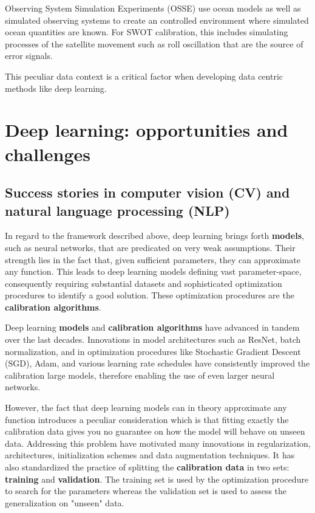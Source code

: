 \begin{bibunit}
Observing System Simulation Experiments (OSSE)\cite{verrierAssessingImpactMultiple2017} use ocean models as well as simulated observing systems to create an controlled environment where simulated ocean quantities are known. For SWOT calibration, this includes simulating processes of the satellite movement such as roll oscillation that are the source of error signals\cite{EmpiricalCrossCalibrationCoherent}.

This peculiar data context is a critical factor when developing data centric methods like deep learning.

% 

\section{Deep learning: opportunities and challenges}

\subsection*{Success stories in computer vision (CV) and natural language processing (NLP)}

In regard to the framework described above, deep learning brings forth \textbf{models}, such as neural networks, that are predicated on very weak assumptions. Their strength lies in the fact that, given sufficient parameters, they can approximate any function\cite{hornikMultilayerFeedforwardNetworks1989}. This leads to deep learning models defining vast parameter-space, consequently requiring substantial datasets and sophisticated optimization procedures to identify a good solution. These optimization procedures are the \textbf{calibration algorithms}.

Deep learning \textbf{models} and \textbf{calibration algorithms} have advanced in tandem over the last decades.
Innovations in model architectures such as ResNet\cite{heDeepResidualLearning2016}, batch normalization\cite{ioffeBatchNormalizationAccelerating2015}, and in optimization procedures like Stochastic Gradient Descent (SGD)\cite{summaLargeScaleMachineLearning2011}, Adam\cite{kingmaAdamMethodStochastic2017}, and various learning rate schedules have consistently improved the calibration large models, therefore enabling the use of even larger neural networks. 

However, the fact that deep learning models can in theory approximate any function introduces a peculiar consideration which is that fitting exactly the calibration data gives you no guarantee on how the model will behave on unseen data.
Addressing this problem have motivated many innovations in regularization, architectures, initialization schemes and data augmentation techniques.
It has also standardized the practice of splitting the \textbf{calibration data} in two sets: \textbf{training} and \textbf{validation}.
The training set is used by the optimization procedure to search for the parameters whereas the validation set is used to assess the generalization on "unseen" data.


\end{bibunit}
